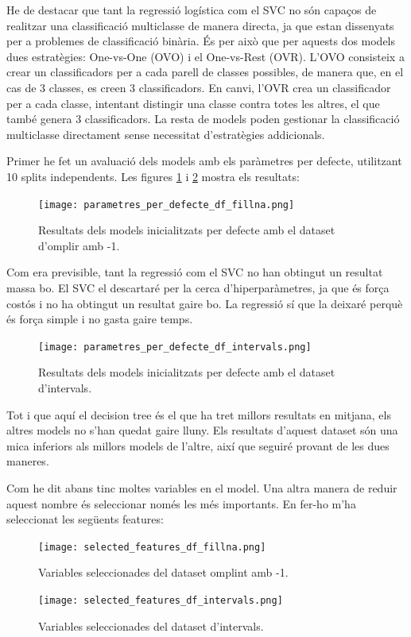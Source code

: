 \documentclass[9pt,a4paper,twoside]{tau-class/tau}
\begin{document}
    He de destacar que tant la regressió logística com el SVC no són capaços de realitzar una classificació multiclasse de manera directa, ja que estan dissenyats per a problemes de classificació binària. És per això que per aquests dos models dues estratègies: One-vs-One (OVO) i el One-vs-Rest (OVR). L'OVO consisteix a crear un classificadors per a cada parell de classes possibles, de manera que, en el cas de 3 classes, es creen 3 classificadors. En canvi, l'OVR crea un classificador per a cada classe, intentant distingir una classe contra totes les altres, el que també genera 3 classificadors. La resta de models poden gestionar la classificació multiclasse directament sense necessitat d'estratègies addicionals.

    Primer he fet un avaluació dels models amb els paràmetres per defecte, utilitzant 10 splits independents. Les figures \ref{fig:figure8} i \ref{fig:figure9} mostra els resultats:
    \begin{figure}[H]
        \centering
        \texttt{[image: parametres\_per\_defecte\_df\_fillna.png]}
        \caption{Resultats dels models inicialitzats per defecte amb el dataset d'omplir amb -1.}
        \label{fig:figure8}
    \end{figure}
    Com era previsible, tant la regressió com el SVC no han obtingut un resultat massa bo. El SVC el descartaré per la cerca d'hiperparàmetres, ja que és força costós i no ha obtingut un resultat gaire bo. La regressió sí que la deixaré perquè és força simple i no gasta gaire temps.

    \begin{figure}[H]
        \centering
        \texttt{[image: parametres\_per\_defecte\_df\_intervals.png]}
        \caption{Resultats dels models inicialitzats per defecte amb el dataset d'intervals.}
        \label{fig:figure9}
    \end{figure}
    Tot i que aquí el decision tree és el que ha tret millors resultats en mitjana, els altres models no s'han quedat gaire lluny. Els resultats d'aquest dataset són una mica inferiors als millors models de l'altre, així que seguiré provant de les dues maneres.

    Com he dit abans tinc moltes variables en el model. Una altra manera de reduir aquest nombre és seleccionar només les més importants. En fer-ho m'ha seleccionat les següents features:
    \begin{figure}[H]
        \centering
        \texttt{[image: selected\_features\_df\_fillna.png]}
        \caption{Variables seleccionades del dataset omplint amb -1.}
        \label{fig:figure10}
    \end{figure}
    \begin{figure}[H]
        \centering
        \texttt{[image: selected\_features\_df\_intervals.png]}
        \caption{Variables seleccionades del dataset d'intervals.}
        \label{fig:figure11}
    \end{figure}
\end{document}
